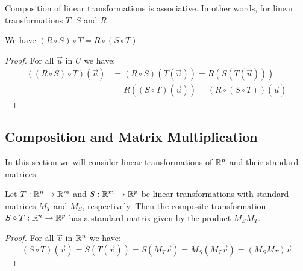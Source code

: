 \documentclass{ximera}
\begin{document}
\begin{theorem}\label{th:compoflintransass} Composition of linear transformations is associative.  In other words, for linear transformations  $T$, $S$ and $R$

\begin{center}

\end{center}

We have $(R\circ S)\circ T=R\circ (S\circ T)$.
\end{theorem}
\begin{proof} For all $\vec{u}$ in $U$ we have:
\begin{align*}
((R\circ S)\circ T)(\vec{u})&=(R\circ S)(T(\vec{u}))=R(S(T(\vec{u})))\\
&=R((S\circ T)(\vec{u}))=(R\circ (S\circ T))(\vec{u})
\end{align*}
\end{proof}

\subsection*{Composition and Matrix Multiplication}

In this section we will consider linear transformations of $\mathbb{R}^n$ and their standard matrices.  

\begin{theorem}\label{th:standardmatcompoflintrans}
Let $T:\mathbb{R}^n\rightarrow \mathbb{R}^m$ and $S:\mathbb{R}^m\rightarrow \mathbb{R}^p$ be linear transformations with standard matrices $M_T$ and $M_S$, respectively.  Then the composite transformation $S\circ T:\mathbb{R}^n\rightarrow \mathbb{R}^p$ has a standard matrix given by the product $M_SM_T$.
\end{theorem}
\begin{proof}
For all $\vec{v}$ in $\mathbb{R}^n$ we have:
$$(S\circ T)(\vec{v})=S(T(\vec{v}))=S(M_T\vec{v})=M_S(M_T\vec{v})=(M_SM_T)\vec{v}$$
\end{proof}
\end{document}
